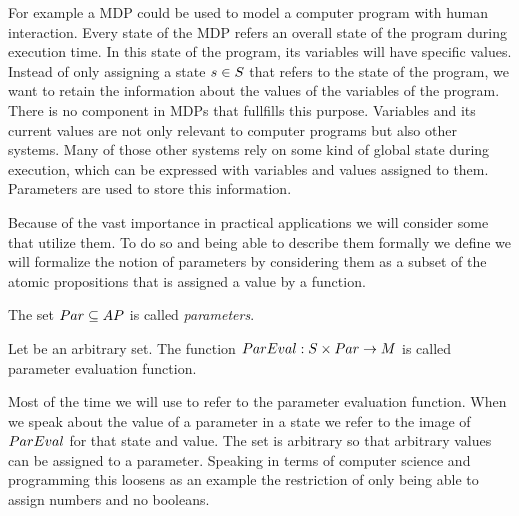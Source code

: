 \documentclass[preview]{standalone}
\begin{document}
For example a MDP could be used to model a computer program with human interaction. Every state of the MDP refers an overall state of the program during execution time. In this state of the program, its variables will have specific values. Instead of only assigning a state ${s} \in {S}$ that refers to the state of the program, we want to retain the information about the values of the variables of the program. There is no component in MDPs that fullfills this purpose. Variables and its current values are not only relevant to computer programs but also other systems. Many of those other systems rely on some kind of global state during execution, which can be expressed with variables and values assigned to them. Parameters are used to store this information.


Because of the vast importance in practical applications we will consider some \viewsN that utilize them. To do so and being able to describe them formally we define we will formalize the notion of parameters by considering them as a subset of the atomic propositions \atomicprops that is assigned a value by a function.

\begin{definition}
	The set ${Par} \subseteq {AP}$ is called \emph{parameters}.
\end{definition}

\begin{definition}
	Let \paramevalimg be an arbitrary set. The function ${ParEval} : {S} \times {Par} \to {\ensuremath{{M}}}$ is called parameter evaluation function.
\end{definition} 

Most of the time we will use \parameval to refer to the parameter evaluation function. When we speak about the value of a parameter in a state we refer to the image of ${ParEval}$ for that state and value. The set \paramevalimg is arbitrary so that arbitrary values can be assigned to a parameter. Speaking in terms of computer science and programming this loosens as an example the restriction of only being able to assign numbers and no booleans.
\end{document}
